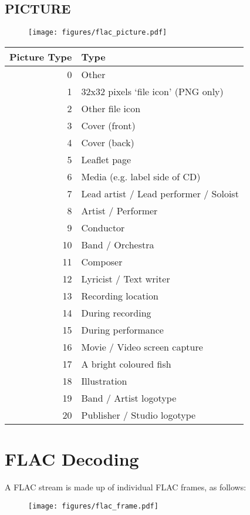 \subsection{PICTURE}
\begin{figure}[h]
\texttt{[image: figures/flac\_picture.pdf]}
\end{figure}
\begin{tabular}{|r|l|}
\hline
Picture Type & Type \\
\hline
0 & Other \\
1 & 32x32 pixels `file icon' (PNG only) \\
2 & Other file icon \\
3 & Cover (front) \\
4 & Cover (back) \\
5 & Leaflet page \\
6 & Media (e.g. label side of CD) \\
7 & Lead artist / Lead performer / Soloist \\
8 & Artist / Performer \\
9 & Conductor \\
10 & Band / Orchestra \\
11 & Composer \\
12 & Lyricist / Text writer \\
13 & Recording location \\
14 & During recording \\
15 & During performance \\
16 & Movie / Video screen capture \\
17 & A bright coloured fish \\
18 & Illustration \\
19 & Band / Artist logotype \\
20 & Publisher / Studio logotype \\
\hline
\end{tabular}

\section{FLAC Decoding}
A FLAC stream is made up of individual FLAC frames, as follows:
\begin{figure}[h]
\texttt{[image: figures/flac\_frame.pdf]}
\end{figure}

